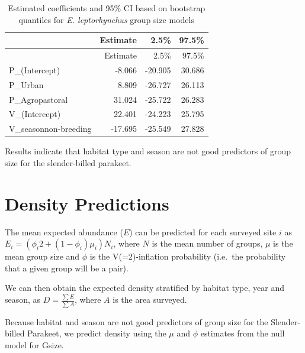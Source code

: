 \documentclass[]{article}
\begin{document}
\begin{longtable}[]{@{}lrrr@{}}
\caption{Estimated coefficients and 95\% CI based on bootstrap quantiles
for \textit{E. leptorhynchus} group size models}\tabularnewline
\toprule
& Estimate & 2.5\% & 97.5\%\tabularnewline
\midrule
\endfirsthead
\toprule
& Estimate & 2.5\% & 97.5\%\tabularnewline
\midrule
\endhead
P\_(Intercept) & -8.066 & -20.905 & 30.686\tabularnewline
P\_Urban & 8.809 & -26.727 & 26.113\tabularnewline
P\_Agropastoral & 31.024 & -25.722 & 26.283\tabularnewline
V\_(Intercept) & 22.401 & -24.223 & 25.795\tabularnewline
V\_seasonnon-breeding & -17.695 & -25.549 & 27.828\tabularnewline
\bottomrule
\end{longtable}

Results indicate that habitat type and season are not good predictors of
group size for the slender-billed parakeet.

\section{Density Predictions}\label{density-predictions-1}

The mean expected abundance (\(E\)) can be predicted for each surveyed
site \(i\) as \(E_{i} = (\phi_{i} 2 + (1 - \phi_{i})\mu_{i})N_{i}\),
where \(N\) is the mean number of groups, \(\mu\) is the mean group size
and \(\phi\) is the V(=2)-inflation probability (i.e.~the probability
that a given group will be a pair).

We can then obtain the expected density stratified by habitat type, year
and season, as \(D = \frac{\sum E}{\sum A}\), where \(A\) is the area
surveyed.

Because habitat and season are not good predictors of group size for the
Slender-billed Parakeet, we predict density using the \(\mu\) and
\(\phi\) estimates from the null model for Gsize.
\end{document}
